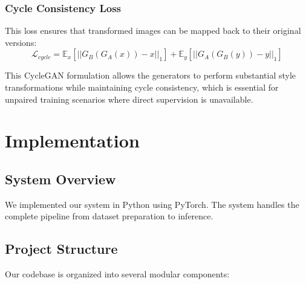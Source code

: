 \documentclass[twocolumn,superscriptaddress,aps]{revtex4-1}
\begin{document}
\subsubsection{Cycle Consistency Loss}
This loss ensures that transformed images can be mapped back to their original versions:
\begin{equation}
\mathcal{L}_{cycle} = \mathbb{E}_{x}[||G_B(G_A(x)) - x||_1] + \mathbb{E}_{y}[||G_A(G_B(y)) - y||_1]
\end{equation}

This CycleGAN formulation allows the generators to perform substantial style transformations while maintaining cycle consistency, which is essential for unpaired training scenarios where direct supervision is unavailable.

\section{Implementation}

\subsection{System Overview}

We implemented our system in Python using PyTorch. The system handles the complete pipeline from dataset preparation to inference.

\subsection{Project Structure}

Our codebase is organized into several modular components:
\end{document}

